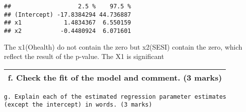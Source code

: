 \documentclass[11pt,]{article}
\begin{document}
\begin{verbatim}
##                   2.5 %    97.5 %
## (Intercept) -17.8384294 44.736887
## x1            1.4834367  6.550159
## x2           -0.4480924  6.071601
\end{verbatim}

The x1(Ohealth) do not contain the zero but x2(SESI) contain the zero,
which reflect the result of the p-value. The X1 is significant

\begin{longtable}[]{@{}r@{}}
\toprule
\begin{minipage}[t]{0.62\columnwidth}\raggedleft\strut
f. Check the fit of the model and comment. (3 marks)\strut
\end{minipage}\tabularnewline
\bottomrule
\end{longtable}

\begin{verbatim}
g. Explain each of the estimated regression parameter estimates (except the intercept) in words. (3 marks)
\end{verbatim}
\end{document}
